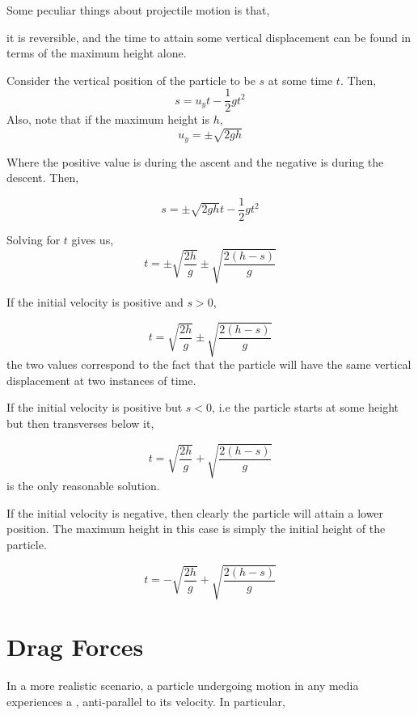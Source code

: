 Some peculiar things about projectile motion is that, \begin{inparaenum}[a)]
    \ii it is reversible, and
    \ii the time to attain some vertical displacement can be found in terms of 
    the maximum height alone.
\end{inparaenum}

Consider the vertical position of the particle to be 
\(s\) at some time \(t\). Then, 
\[s = u_yt - \frac{1}{2}gt^2\] 
Also, note that if the maximum height is \(h\), 
\[u_y = \pm \sqrt{2gh}\]

Where the positive value is during the ascent and the negative is during the descent. Then,

\[s = \pm\sqrt{2gh}t - \frac{1}{2}gt^2\]

Solving for \(t\) gives us,
\[t = \pm \sqrt{\frac{2h}{g}} \pm \sqrt{\frac{2(h-s)}{g}}\]

If the initial velocity is positive and \(s > 0\), 

\begin{equation}
    t = \sqrt{\frac{2h}{g}} \pm \sqrt{\frac{2(h-s)}{g}}
\end{equation}
the two values correspond to the fact that the particle will have the same vertical
displacement at two instances of time.

If the initial velocity is positive but \(s < 0\), i.e the particle 
starts at some height but then transverses below it, 

\begin{equation}
    t = \sqrt{\frac{2h}{g}} + \sqrt{\frac{2(h-s)}{g}}
\end{equation}
is the only reasonable solution.

If the initial velocity is negative, then clearly the 
particle will attain a lower position. The maximum height in this 
case is simply the initial height of the particle.

\begin{equation}
    t = - \sqrt{\frac{2h}{g}} + \sqrt{\frac{2(h-s)}{g}}
\end{equation}


\section{Drag Forces}

In a more realistic scenario, a particle undergoing motion in any 
media experiences a , anti-parallel to its velocity.
In particular,  

